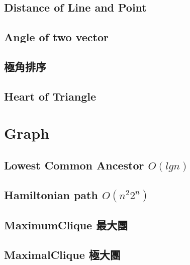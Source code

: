 \documentclass[a4paper,10pt,twocolumn,oneside]{article}
\begin{document}
\subsection{Distance of Line and Point}


\subsection{Angle of two vector}


\subsection{極角排序}


\subsection{Heart of Triangle}


\section{Graph}

%

\subsection{Lowest Common Ancestor $O(lgn)$}


\subsection{Hamiltonian path $O(n^{2}2^{n})$}


\subsection{MaximumClique 最大團}
% 


\subsection{MaximalClique 極大團}
% 

\end{document}
